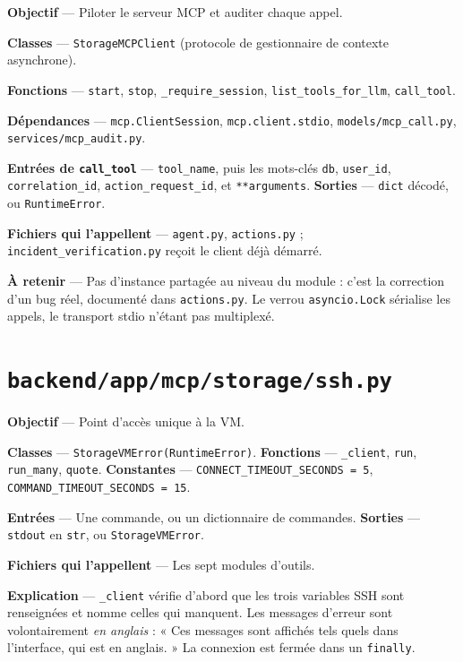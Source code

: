 \documentclass[11pt,a4paper]{report}
\newcommand{\file}[1]{\texttt{\small #1}}
\newcommand{\fn}[1]{\texttt{\small\textcolor{oasisviolet}{#1}}}
\newcommand{\cls}[1]{\texttt{\small\textcolor{oasisblue}{#1}}}
\begin{document}
\textbf{Objectif} --- Piloter le serveur MCP et auditer chaque appel.

\textbf{Classes} --- \cls{StorageMCPClient} (protocole de gestionnaire de
contexte asynchrone).

\textbf{Fonctions} --- \fn{start}, \fn{stop}, \fn{\_require\_session},
\fn{list\_tools\_for\_llm}, \fn{call\_tool}.

\textbf{Dépendances} --- \texttt{mcp.ClientSession},
\texttt{mcp.client.stdio}, \file{models/mcp\_call.py},
\file{services/mcp\_audit.py}.

\textbf{Entrées de \fn{call\_tool}} --- \texttt{tool\_name}, puis les mots-clés
\texttt{db}, \texttt{user\_id}, \texttt{correlation\_id},
\texttt{action\_request\_id}, et \texttt{**arguments}.
\textbf{Sorties} --- \texttt{dict} décodé, ou \cls{RuntimeError}.

\textbf{Fichiers qui l'appellent} --- \file{agent.py}, \file{actions.py} ;
\file{incident\_verification.py} reçoit le client déjà démarré.

\textbf{À retenir} --- Pas d'instance partagée au niveau du module : c'est la
correction d'un bug réel, documenté dans \file{actions.py}. Le verrou
\texttt{asyncio.Lock} sérialise les appels, le transport stdio n'étant pas
multiplexé.

\section{\file{backend/app/mcp/storage/ssh.py}}

\textbf{Objectif} --- Point d'accès unique à la VM.

\textbf{Classes} --- \cls{StorageVMError(RuntimeError)}.
\textbf{Fonctions} --- \fn{\_client}, \fn{run}, \fn{run\_many}, \fn{quote}.
\textbf{Constantes} --- \texttt{CONNECT\_TIMEOUT\_SECONDS = 5},
\texttt{COMMAND\_TIMEOUT\_SECONDS = 15}.

\textbf{Entrées} --- Une commande, ou un dictionnaire de commandes.
\textbf{Sorties} --- \texttt{stdout} en \texttt{str}, ou \cls{StorageVMError}.

\textbf{Fichiers qui l'appellent} --- Les sept modules d'outils.

\textbf{Explication} --- \fn{\_client} vérifie d'abord que les trois variables
SSH sont renseignées et nomme celles qui manquent. Les messages d'erreur sont
volontairement \emph{en anglais} : « Ces messages sont affichés tels quels dans
l'interface, qui est en anglais. » La connexion est fermée dans un
\texttt{finally}.
\end{document}
